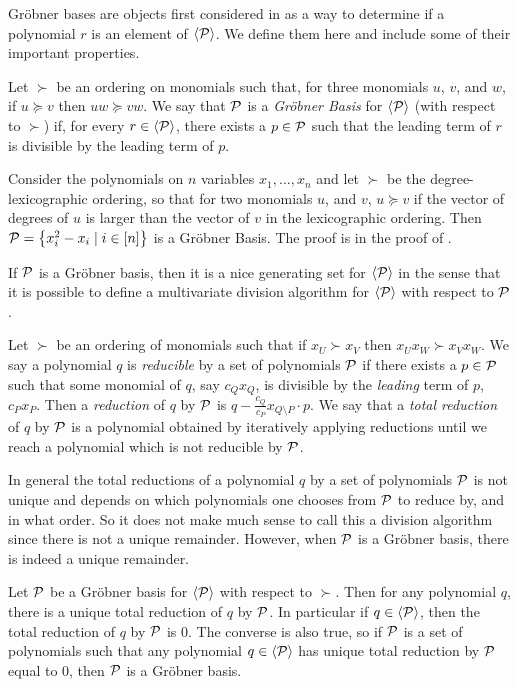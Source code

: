 Gr\"obner bases are objects first considered in \cite{Buch65} as a way to determine if a polynomial $r$ is an element of $\langle \mathcal P \rangle$. We define them here and include some of their important properties.
\begin{definition}\label{def:grobner}
    Let $\succ$ be an ordering on monomials such that, for three monomials $u$, $v$, and $w$, if $u \succeq v$ then $uw \succeq vw$. We say that $\mathcal P$ is a \emph{Gr\"obner Basis} for $\langle \mathcal P \rangle$ (with respect to $\succ$) if, for every $r \in \langle \mathcal P \rangle$, there exists a $p \in \mathcal P$ such that the leading term of $r$ is divisible by the leading term of $p$.
\end{definition}
\begin{example}\label{ex:grobner}
Consider the polynomials on $n$ variables $x_1,\dots,x_n$ and let $\succ$ be the degree-lexicographic ordering, so that for two monomials $u$, and $v$, $u \succeq v$ if the vector of degrees of $u$ is larger than the vector of $v$ in the lexicographic ordering. Then $\mathcal P = \left\{x_i^2 - x_i \mid i \in [n]\right\}$ is a Gr\"obner Basis. The proof is in the proof of .
\end{example}
If $\mathcal P$ is a Gr\"obner basis, then it is a nice generating set for $\langle \mathcal P \rangle$ in the sense that it is possible to define a multivariate division algorithm for $\langle \mathcal P \rangle$ with respect to $\mathcal P$.
\begin{definition}
Let $\succ$ be an ordering of monomials such that if $x_U \succ x_V$ then $x_Ux_W \succ x_Vx_W$. We say a polynomial $q$ is \emph{reducible} by a set of polynomials $\mathcal P$ if there exists a $p \in \mathcal P$ such that some monomial of $q$, say $c_Qx_Q$, is divisible by the \emph{leading} term of $p$, $c_Px_P$. Then a \emph{reduction} of $q$ by $\mathcal P$ is $q - \frac{c_Q}{c_P}x_{Q \setminus P} \cdot p$. We say that a \emph{total reduction} of $q$ by $\mathcal P$ is a polynomial obtained by iteratively applying reductions until we reach a polynomial which is not reducible by $\mathcal P$.
\end{definition}
In general the total reductions of a polynomial $q$ by a set of polynomials $\mathcal P$ is not unique and depends on which polynomials one chooses from $\mathcal P$ to reduce by, and in what order. So it does not make much sense to call this a division algorithm since there is not a unique remainder. However, when $\mathcal P$ is a Gr\"obner basis, there is indeed a unique remainder.
\begin{proposition}\label{prop:grobner-unique}
Let $\mathcal P$ be a Gr\"obner basis for $\langle \mathcal P \rangle$ with respect to $\succ$. Then for any polynomial $q$, there is a unique total reduction of $q$ by $\mathcal P$. In particular if $q \in \langle \mathcal P \rangle$, then the total reduction of $q$ by $\mathcal P$ is $0$. The converse is also true, so if $\mathcal P$ is a set of polynomials such that any polynomial $q \in \langle \mathcal P \rangle$ has unique total reduction by $\mathcal P$ equal to $0$, then $\mathcal P$ is a Gr\"obner basis.
\end{proposition}
